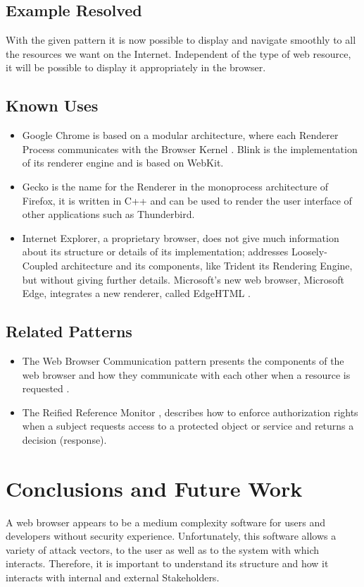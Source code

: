 \documentclass[prodmode,acmtecs]{acmsmall}
\begin{document}
  \subsection*{Example Resolved}
With the given pattern it is now possible to display and navigate smoothly to all the resources we want on the Internet. Independent of the type of web resource, it will be possible to display it appropriately in the browser. 
  \subsection*{Known Uses}
  \begin{itemize}\leftskip0.2em
    \item Google Chrome is based on a modular architecture, where each Renderer Process communicates with the Browser Kernel \cite{multiProcGC}. Blink is the implementation of its renderer engine and is based on WebKit.
    \item Gecko \cite{gecko2} is the name for the Renderer in the monoprocess architecture of Firefox, it is written in C++ and can be used to render the user interface of other applications such as Thunderbird.
    \item Internet Explorer, a proprietary browser, does not give much information about its structure or details of its implementation; \cite{Crowley2010} addresses Loosely-Coupled architecture \cite{IE8-LCIE} and its components, like Trident its Rendering Engine, but without giving further details. Microsoft's new web browser, Microsoft Edge, integrates a new renderer, called EdgeHTML \cite{edgehtml}.
  \end{itemize}

  \subsection*{Related Patterns}
  \begin{itemize}\leftskip0.2em
    \item The Web Browser Communication pattern presents the components of the web browser and how they communicate with each other when a resource is requested \cite{silva2015}. 
    \item The Reified Reference Monitor \cite{fernandez2013security}, describes how to enforce authorization rights when a subject requests access to a protected object or service and returns a decision (response). 
  \end{itemize}

\section{Conclusions and Future Work}
A web browser appears to be a medium complexity software for users and developers without security experience. Unfortunately, this software allows a variety of attack vectors, to the user as well as to the system with which interacts. Therefore, it is important to understand its structure and how it interacts with internal and external Stakeholders.
\end{document}
